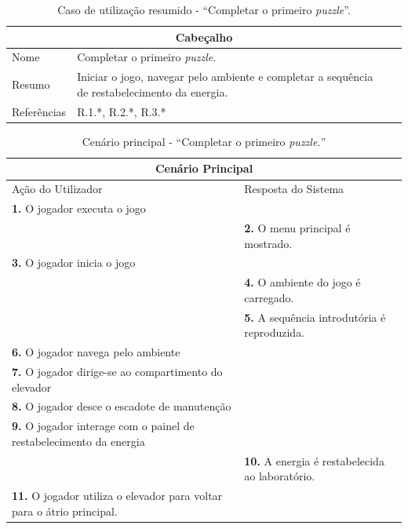 \documentclass[a4paper, 12pt]{book}
\begin{document}
\begin{table}[H]
    \centering
    \begin{tabular}{|l|p{9cm}|l|}
        \hline
        \multicolumn{3}{|c|}{\textbf{Cabeçalho}} \\ \hline
        Nome & Completar o primeiro \textit{puzzle}. \\ \hline
        Resumo & Iniciar o jogo, navegar pelo ambiente e completar a sequência de
        restabelecimento da energia. \\ \hline
        Referências & R.1.*, R.2.*, R.3.* \\ \hline
    \end{tabular}
    \caption{Caso de utilização resumido - ``Completar o primeiro \textit{puzzle}''.}
    \label{tab:casos-util-3}
\end{table}

\begin{table}[H]
    \centering
    \begin{tabular}{|p{7cm}|p{7cm}|}
        \hline
        \multicolumn{2}{|c|}{\textbf{Cenário Principal}} \\ \hline
        Ação do Utilizador & Resposta do Sistema \\ \hline
        \textbf{1.} O jogador executa o jogo & \\\hline
        & \textbf{2.} O menu principal é mostrado. \\ \hline
        \textbf{3.} O jogador inicia o jogo & \\\hline
        & \textbf{4.} O ambiente do jogo é carregado. \\ \hline
        & \textbf{5.} A sequência introdutória é reproduzida. \\ \hline
        \textbf{6.} O jogador navega pelo ambiente & \\\hline
        \textbf{7.} O jogador dirige-se ao compartimento do elevador & \\\hline
        \textbf{8.} O jogador desce o escadote de manutenção & \\\hline
        \textbf{9.} O jogador interage com o painel de restabelecimento da energia & \\\hline
        & \textbf{10.} A energia é restabelecida ao laboratório. \\\hline
        \textbf{11.} O jogador utiliza o elevador para voltar para o átrio principal. & \\\hline

    \end{tabular}
    \caption{Cenário principal - ``Completar o primeiro \textit{puzzle.}''}
    \label{tab:cenário}
\end{table}
\end{document}
